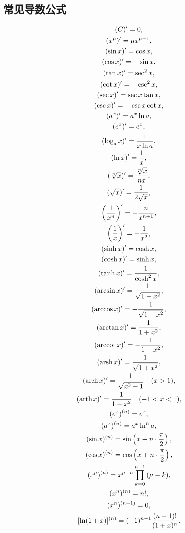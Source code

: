 \subsection{常见导数公式}
\begin{gather*}
(C)' = 0, \\
(x^\mu)' = \mu x^{\mu-1}, \\
(\sin x)' = \cos x, \\
(\cos x)' = - \sin x, \\
(\tan x)' = \sec^2 x, \\
(\cot x)' = - \csc^2 x, \\
(\sec x)' = \sec x \tan x, \\
(\csc x)' = - \csc x \cot x, \\
(a^x)' = a^x \ln a, \\
(e^x)' = e^x, \\
(\log_a x)' = \frac{1}{x \ln a}, \\
(\ln x)' = \frac{1}{x}, \\
(\sqrt[n]{x})' = \frac{\sqrt[n]{x}}{n x}, \\
(\sqrt{x})' = \frac{1}{2\sqrt{x}}, \\
\left(\frac{1}{x^n}\right)' = -\frac{n}{x^{n+1}}, \\
\left(\frac{1}{x}\right)' = -\frac{1}{x^2}, \\
(\sinh x)' = \cosh x, \\
(\cosh x)' = \sinh x, \\
(\tanh x)' = \frac{1}{\cosh^2 x}, \\
(\arcsin x)' = \frac{1}{\sqrt{1 - x^2}}, \\
(\arccos x)' = - \frac{1}{\sqrt{1 - x^2}}, \\
(\arctan x)' = \frac{1}{1 + x^2}, \\
(\arccot x)' = - \frac{1}{1 + x^2}, \\
(\arsh x)' = \frac{1}{\sqrt{1 + x^2}}, \\
(\arch x)' = \frac{1}{\sqrt{x^2 - 1}} \quad (x > 1), \\
(\arth x)' = \frac{1}{1 - x^2} \quad (-1 < x < 1), \\
(e^x)^{(n)} = e^x, \\
(a^x)^{(n)} = a^x \ln^n a, \\
(\sin x)^{(n)} = \sin \left( x + n \cdot \frac{\pi}{2} \right), \\
(\cos x)^{(n)} = \cos \left( x + n \cdot \frac{\pi}{2} \right), \\
(x^\mu)^{(n)} = x^{\mu-n}\prod_{k=0}^{n-1} {(\mu - k)}, \\
(x^n)^{(n)} = n!, \\
(x^n)^{(n+1)} = 0, \\
[\ln(1+x)]^{(n)} = (-1)^{n-1} \frac{(n-1)!}{(1+x)^n}.
\end{gather*}
